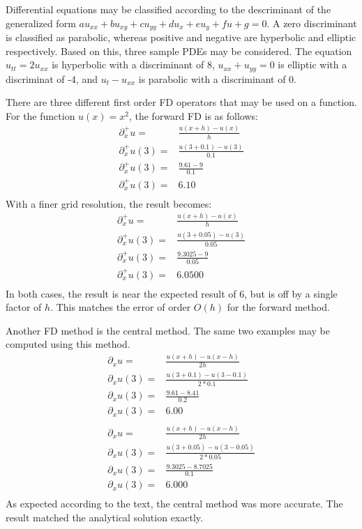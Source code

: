 \documentclass[twocolumn]{article}
\begin{document}
Differential equations may be classified according to the descriminant of the generalized form $au_{xx} + bu_{xy} + cu_{yy} + du_{x} +eu_y +fu + g =0$. A zero discriminant is classified as parabolic, whereas positive and negative are hyperbolic and elliptic respectively. Based on this, three sample PDEs may be considered. The equation $u_{tt} = 2u_{xx}$ is hyperbolic with a discriminant of 8, $u_{xx} + u_{yy} = 0$ is elliptic with a discriminat of -4, and $u_t - u_{xx}$ is parabolic with a discriminant of 0.

There are three different first order FD operators that may be used on a function. For the function $u(x)=x^2$, the forward FD is as follows:
\begin{equation}
\begin{split}
\partial_x^+ u =& \frac{u(x+h) - u(x)}{h} \\
\partial_x^+ u(3) =& \frac{u(3+0.1) - u(3)}{0.1} \\
\partial_x^+ u(3) =& \frac{9.61-9}{0.1} \\
\partial_x^+ u(3) =& 6.10 \\
\end{split}
\end{equation}
With a finer grid resolution, the result becomes:
\begin{equation}
\begin{split}
\partial_x^+ u =& \frac{u(x+h) - u(x)}{h} \\
\partial_x^+ u(3) =& \frac{u(3+0.05) - u(3)}{0.05} \\
\partial_x^+ u(3) =& \frac{9.3025-9}{0.05} \\
\partial_x^+ u(3) =& 6.0500 \\
\end{split}
\end{equation}
In both cases, the result is near the expected result of 6, but is off by a single factor of $h$. This matches the error of order $O(h)$ for the forward method. 

Another FD method is the central method. The same two examples may be computed using this method.
\begin{equation}
\begin{split}
\partial_x u =& \frac{u(x+h) - u(x-h)}{2h} \\
\partial_x u(3) =& \frac{u(3+0.1) - u(3-0.1)}{2*0.1} \\
\partial_x u(3) =& \frac{9.61-8.41}{0.2} \\
\partial_x u(3) =& 6.00 \\
\\ 
\partial_x u =& \frac{u(x+h) - u(x-h)}{2h} \\
\partial_x u(3) =& \frac{u(3+0.05) - u(3-0.05)}{2*0.05} \\
\partial_x u(3) =& \frac{9.3025-8.7025}{0.1} \\
\partial_x u(3) =& 6.000 \\
\end{split}
\end{equation}
As expected according to the text, the central method was more accurate. The result matched the analytical solution exactly.
\end{document}
